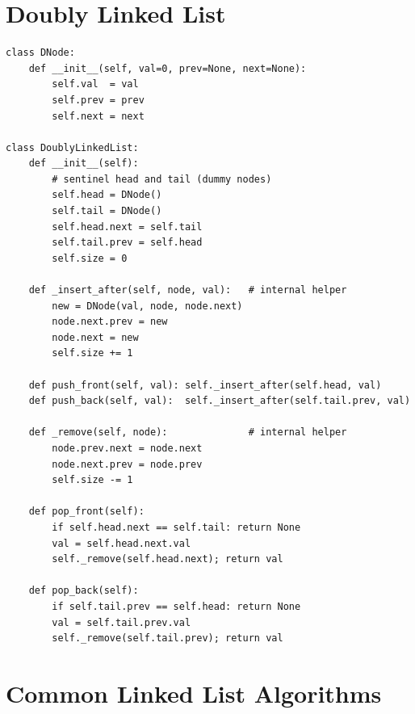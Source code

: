 \documentclass[11pt,a4paper]{report}
\begin{document}
\section{Doubly Linked List}

\begin{lstlisting}
class DNode:
    def __init__(self, val=0, prev=None, next=None):
        self.val  = val
        self.prev = prev
        self.next = next

class DoublyLinkedList:
    def __init__(self):
        # sentinel head and tail (dummy nodes)
        self.head = DNode()
        self.tail = DNode()
        self.head.next = self.tail
        self.tail.prev = self.head
        self.size = 0

    def _insert_after(self, node, val):   # internal helper
        new = DNode(val, node, node.next)
        node.next.prev = new
        node.next = new
        self.size += 1

    def push_front(self, val): self._insert_after(self.head, val)
    def push_back(self, val):  self._insert_after(self.tail.prev, val)

    def _remove(self, node):              # internal helper
        node.prev.next = node.next
        node.next.prev = node.prev
        self.size -= 1

    def pop_front(self):
        if self.head.next == self.tail: return None
        val = self.head.next.val
        self._remove(self.head.next); return val

    def pop_back(self):
        if self.tail.prev == self.head: return None
        val = self.tail.prev.val
        self._remove(self.tail.prev); return val
\end{lstlisting}

\section{Common Linked List Algorithms}
\end{document}
